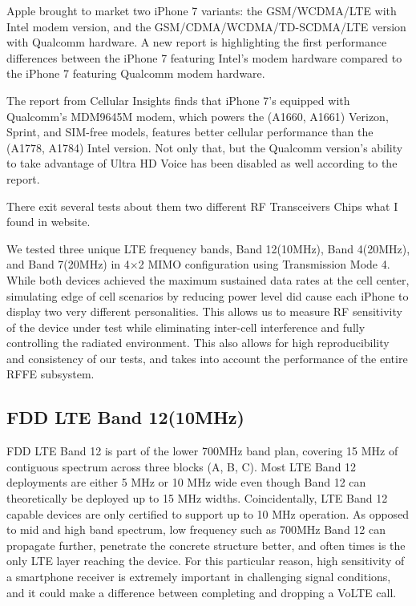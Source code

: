\documentclass[conference]{IEEEtran}
\begin{document}
Apple brought to market two iPhone 7 variants: the GSM/WCDMA/LTE with Intel modem version, and the GSM/CDMA/WCDMA/TD-SCDMA/LTE version with Qualcomm hardware. A new report is highlighting the first performance differences between the iPhone 7 featuring Intel’s modem hardware compared to the iPhone 7 featuring Qualcomm modem hardware.

The report from Cellular Insights\cite{cellularinsights.org} finds that iPhone 7’s equipped with Qualcomm’s MDM9645M modem, which powers the (A1660, A1661) Verizon, Sprint, and SIM-free models, features better cellular performance than the (A1778, A1784) Intel version. Not only that, but the Qualcomm version’s ability to take advantage of Ultra HD Voice has been disabled as well according to the report.

There exit several tests about them two different RF Transceivers Chips what I found in website\cite{cellularinsights.org}.

We tested three unique LTE frequency bands, Band 12(10MHz), Band 4(20MHz), and Band 7(20MHz) in 4$\times$2 MIMO configuration using Transmission Mode 4. While both devices achieved the maximum sustained data rates at the cell center, simulating edge of cell scenarios by reducing power level did cause each iPhone to display two very different personalities.  This allows us to measure RF sensitivity of the device under test while eliminating inter-cell interference and fully controlling the radiated environment. This also allows for high reproducibility and consistency of our tests, and takes into account the performance of the entire RFFE subsystem. 

\subsection{FDD LTE Band 12(10MHz)}
FDD LTE Band 12 is part of the lower 700MHz band plan, covering 15 MHz of contiguous spectrum across three blocks (A, B, C). Most LTE Band 12 deployments are either 5 MHz or 10 MHz wide even though Band 12 can theoretically be deployed up to 15 MHz widths. Coincidentally, LTE Band 12 capable devices are only certified to support up to 10 MHz operation. As opposed to mid and high band spectrum, low frequency such as 700MHz Band 12 can propagate further, penetrate the concrete structure better, and often times is the only LTE layer reaching the device. For this particular reason, high sensitivity of a smartphone receiver is extremely important in challenging signal conditions, and it could make a difference between completing and dropping a VoLTE call.
\end{document}
